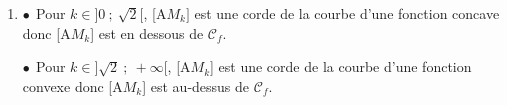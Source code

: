 \begin{enumerate}
\begin{enumerate}
Le trinôme, donc $f''(x)$ est positif sauf sur l'intervalle $\left]-\sqrt 2~;~\sqrt{2}\right[$ ou ici puisque $x > 0, \: f''(x)$ est positif sauf sur l'intervalle $\left]0~;~\sqrt{2}\right[$. Conclusion :

$\bullet~~$ Sur l'intervalle $\left]0~;~\sqrt 2\right]$, $f''(x) < 0$, la fonction $f$ est concave ;

$\bullet~~$ Sur l'intervalle $\left]\sqrt 2~;~+ \infty\right]$, $f''(x) > 0$, la fonction $f$ est convexe ;

$\bullet~~$$f''\left(\sqrt 2\right) = 0$ : le point d'abscisse $\sqrt 2$, donc d'ordonnée $f\left( \right) = 2 - 6\sqrt 2 + 4 \ln \sqrt 2 = 2 - 6\sqrt 2 + 4 \times \dfrac12\ln 2 = 2 - 6\sqrt 2 + 2\ln 2$ est le point d'inflexion de $\mathcal{C}_f$, car en ce point la dérivée seconde s'annule en changeant de signe.
		\item 
		



$\bullet~~$Pour $k \in  ]0~;~\sqrt 2[$, [A$M_k]$ est une corde de la courbe d'une fonction concave donc [A$M_k$] est en dessous de $\mathcal{C}_f$.

$\bullet~~$Pour $k \in ]\sqrt 2~;~ +\infty[$, [A$M_k$] est une corde de la courbe d'une fonction convexe donc [A$M_k$] est au-dessus de $\mathcal{C}_f$.
	\end{enumerate}
\end{enumerate}

\bigskip
